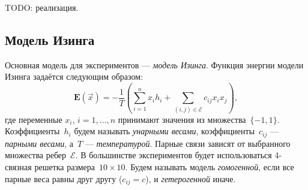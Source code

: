 \alert{TODO: реализация.}


\subsection{Модель Изинга}
Основная модель для экспериментов --- \emph{модель Изинга}.
Функция энергии модели Изинга задаётся следующим образом:
\begin{equation}
\label{eq::ising}
\mathbf{E}(\vec{x}) = -\frac{1}{T}\left(\sum_{i=1}^n x_i h_i + \sum_{(i,j) \in \mathcal{E}} c_{ij} x_i x_j\right),
\end{equation}
где переменные $x_i$, $i = 1,\ldots,n$ принимают значения из множества~$\{-1, 1\}$. Коэффициенты~$h_i$ будем называть \emph{унарными весами}, коэффициенты~$c_{ij}$ --- \emph{парными весами}, а~$T$ --- \emph{температурой}. Парные связи зависят от выбранного множества ребер~$\mathcal{E}$. В большинстве экспериментов будет использоваться 4-связная решетка размера~$10 \times 10$. Будем называть модель \emph{гомогенной}, если все парные веса равны друг другу ($c_{ij} = c$), и \emph{гетерогенной} иначе.


